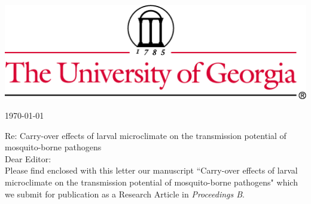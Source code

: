 \documentclass{letter}
\begin{document}

\begin{letter}


\vspace{-2in}
\includegraphics[width=\textwidth]{thin4c.png}

\begin{flushright}
\today
\end{flushright}


Re: Carry-over effects of larval microclimate on the transmission potential of mosquito-borne pathogens\\

Dear Editor:\\

Please find enclosed with this letter our manuscript ``Carry-over effects of larval microclimate on the transmission potential of mosquito-borne pathogens" which we submit for publication as a Research Article in \textit{{Proceedings B}}.\\


\end{letter}
\end{document}
